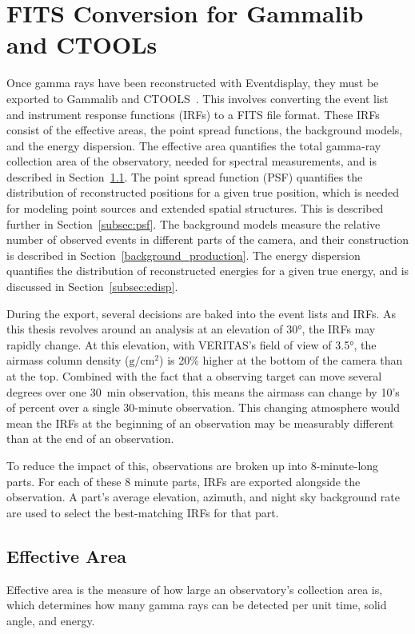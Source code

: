 \section{FITS Conversion for Gammalib and CTOOLs}\label{fitsconversion}
  Once gamma rays have been reconstructed with Eventdisplay, they must be exported to Gammalib and CTOOLS~\cite{gammalibctools}.
  This involves converting the event list and instrument response functions (IRFs) to a FITS file format.
  These IRFs consist of the effective areas, the point spread functions, the background models, and the energy dispersion.
  The effective area quantifies the total gamma-ray collection area of the observatory, needed for spectral measurements, and is described in Section~\ref{subsec:effarea}.
  The point spread function (PSF) quantifies the distribution of reconstructed positions for a given true position, which is needed for modeling point sources and extended spatial structures.
  This is described further in Section~\ref{subsec:psf}.
  The background models measure the relative number of observed events in different parts of the camera, and their construction is described in Section~\ref{background_production}.
  The energy dispersion quantifies the distribution of reconstructed energies for a given true energy, and is discussed in Section~\ref{subsec:edisp}.
  
  During the export, several decisions are baked into the event lists and IRFs.
  As this thesis revolves around an analysis at an elevation of \nicetilde{}\ang{30}, the IRFs may rapidly change.
  At this elevation, with VERITAS's field of view of \ang{3.5}, the airmass column density ($\textrm{g}/\textrm{cm}^2$) is 20\% higher at the bottom of the camera than at the top.
  Combined with the fact that a observing target can move several degrees over one \SI{30}{min} observation, this means the airmass can change by 10's of percent over a single 30-minute observation.
  This changing atmosphere would mean the IRFs at the beginning of an observation may be measurably different than at the end of an observation.

  To reduce the impact of this, observations are broken up into 8-minute-long parts.
  For each of these 8 minute parts, IRFs are exported alongside the observation.
  A part's average elevation, azimuth, and night sky background rate are used to select the best-matching IRFs for that part.

  \FloatBarrier
  
  \subsection{Effective Area}\label{subsec:effarea}
    Effective area is the measure of how large an observatory's collection area is, which determines how many gamma rays can be detected per unit time, solid angle, and energy.

